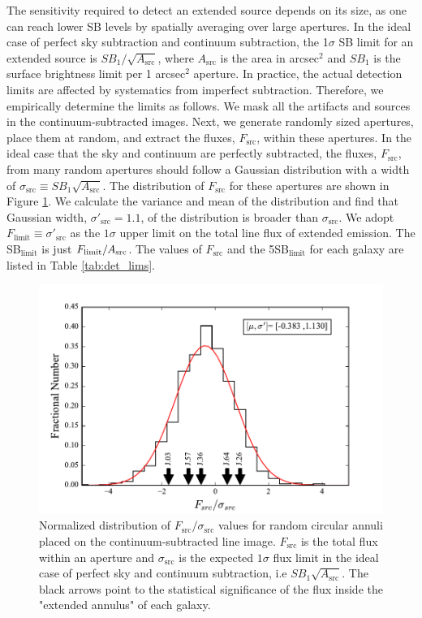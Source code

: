 \documentclass[twocolumn]{aastex61}
\begin{document}
The sensitivity required to detect an extended source depends on its size, as one can reach lower SB levels by spatially averaging over large apertures. In the ideal case of perfect sky subtraction and continuum subtraction, the 1$\sigma$ SB limit for an extended source is $SB_{1}/\sqrt{A_\text{src}}$, where $A_\text{src}$ is the area in arcsec$^2$ and $SB_{1}$ is the surface brightness limit per 1 arcsec$^2$ aperture. In practice, the actual detection limits are affected by systematics from imperfect subtraction. Therefore, we empirically determine the limits as follows. We mask all the artifacts and sources in the continuum-subtracted images. Next, we generate randomly sized apertures, place them at random, and extract the fluxes, $F_{\text{src}}$, within these apertures. In the ideal case that the sky and continuum are perfectly subtracted, the fluxes, $F_{\text{src}}$, from many random apertures should follow a Gaussian distribution with a width of $\sigma_{\text{src}} \equiv SB_{1}\sqrt{A_\text{src}}$. The distribution of $F_{\text{src}}$ for these apertures are shown in Figure \ref{fig:limits}.
We calculate the variance and mean of the distribution and find that Gaussian width, $\sigma'_{\text{src}}=1.1$, of the distribution is broader than $\sigma_{\text{src}}$. We adopt $F_{\text{limit}} \equiv \sigma'_{\text{src}}$  as the $1 \sigma$ upper limit on the total line flux of extended  emission. The SB$_{\text{limit}}$ is just $F_{\text{limit}}/A_{\rm{src}}$. The values of $F_{\text{src}}$ and the 5SB$_{\text{limit}}$ for each galaxy are listed in Table \ref{tab:det_lims}.

\begin{figure}[!ht]
\centering
\includegraphics[scale=0.6]{../Figures/hist_sblim.pdf}
\caption{Normalized distribution of $F_{\text{src}}/\sigma_{\text{src}}$ values for random circular annuli placed on the continuum-subtracted line image. $F_{\text{src}}$ is the total flux within an aperture and $\sigma_{\text{src}}$ is the expected $1\sigma$ flux limit in the ideal case of perfect sky and continuum subtraction, i.e $SB_{1}\sqrt{A_\text{src}}$. The black arrows point to the statistical significance of the flux inside the "extended annulus" of each galaxy.}
\label{fig:limits}
\end{figure}
\end{document}
